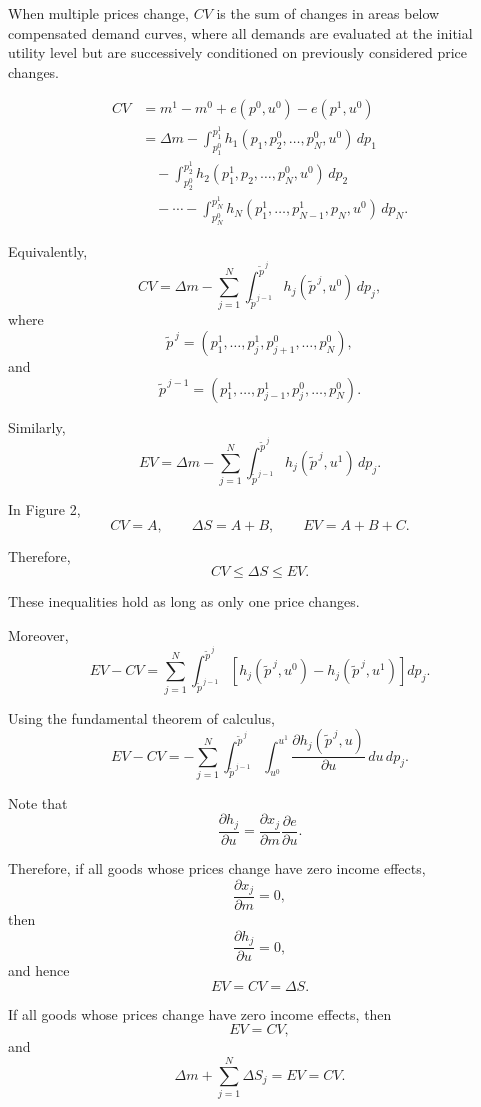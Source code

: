 When multiple prices change, \(CV\) is the sum of changes in areas below compensated demand curves, where all demands are evaluated at the initial utility level but are successively conditioned on previously considered price changes.



\[
\begin{aligned}
CV
&=
m^1-m^0+e(p^0,u^0)-e(p^1,u^0) \\
&=
\Delta m
-
\int_{p_1^0}^{p_1^1}
h_1(p_1,p_2^0,\dots,p_N^0,u^0)\,dp_1 \\
&\quad
-
\int_{p_2^0}^{p_2^1}
h_2(p_1^1,p_2,\dots,p_N^0,u^0)\,dp_2 \\
&\quad
-\cdots-
\int_{p_N^0}^{p_N^1}
h_N(p_1^1,\dots,p_{N-1}^1,p_N,u^0)\,dp_N.
\end{aligned}
\]

Equivalently,
\[
CV
=
\Delta m
-
\sum_{j=1}^N
\int_{\tilde p^{\,j-1}}^{\tilde p^{\,j}}
h_j(\tilde p^{\,j},u^0)\,dp_j,
\]
where
\[
\tilde p^{\,j}
=
(p_1^1,\dots,p_j^1,p_{j+1}^0,\dots,p_N^0),
\]
and
\[
\tilde p^{\,j-1}
=
(p_1^1,\dots,p_{j-1}^1,p_j^0,\dots,p_N^0).
\]

Similarly,
\[
EV
=
\Delta m
-
\sum_{j=1}^N
\int_{\tilde p^{\,j-1}}^{\tilde p^{\,j}}
h_j(\tilde p^{\,j},u^1)\,dp_j.
\]

In Figure 2,
\[
CV=A,
\qquad
\Delta S=A+B,
\qquad
EV=A+B+C.
\]

Therefore,
\[
CV\le \Delta S\le EV.
\]

These inequalities hold as long as only one price changes.

Moreover,
\[
EV-CV
=
\sum_{j=1}^N
\int_{\tilde p^{\,j-1}}^{\tilde p^{\,j}}
\left[
h_j(\tilde p^{\,j},u^0)
-
h_j(\tilde p^{\,j},u^1)
\right]
dp_j.
\]

Using the fundamental theorem of calculus,
\[
EV-CV
=
-
\sum_{j=1}^N
\int_{\tilde p^{\,j-1}}^{\tilde p^{\,j}}
\int_{u^0}^{u^1}
\frac{\partial h_j(\tilde p^{\,j},u)}{\partial u}
\,du\,dp_j.
\]

Note that
\[
\frac{\partial h_j}{\partial u}
=
\frac{\partial x_j}{\partial m}
\frac{\partial e}{\partial u}.
\]

Therefore, if all goods whose prices change have zero income effects,
\[
\frac{\partial x_j}{\partial m}=0,
\]
then
\[
\frac{\partial h_j}{\partial u}=0,
\]
and hence
\[
EV=CV=\Delta S.
\]



If all goods whose prices change have zero income effects, then
\[
EV=CV,
\]
and
\[
\Delta m+\sum_{j=1}^N \Delta S_j
=
EV
=
CV.
\]

